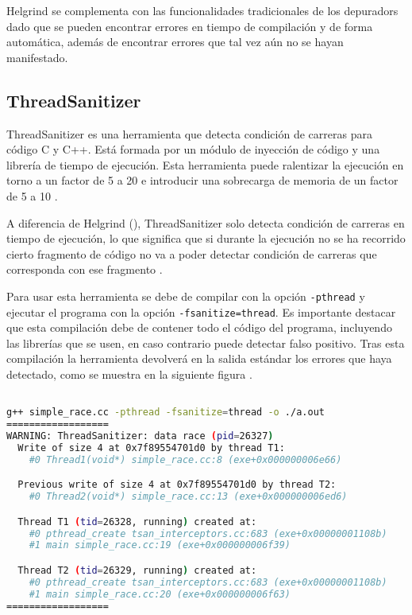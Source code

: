 Helgrind se complementa con las funcionalidades tradicionales de los \glspl{depurador} dado que se pueden encontrar errores en \gls{tiempo de compilación} y de forma automática, además de encontrar errores que tal vez aún no se hayan manifestado.

\subsection{ThreadSanitizer}{\label{subsec:thread-sanitizer}}

ThreadSanitizer es una herramienta que detecta \glspl{condición de carrera} para código C y C++. Está formada por un módulo de \gls{inyección de código} y una librería de \gls{tiempo de ejecución}. Esta herramienta puede ralentizar la ejecución en torno a un factor de 5 a 20 e introducir una sobrecarga de memoria de un factor de 5 a 10 \cite{ThreadSanitizer}.

A diferencia de Helgrind (), ThreadSanitizer solo detecta \glspl{condición de carrera} en \gls{tiempo de ejecución}, lo que significa que si durante la ejecución no se ha recorrido cierto fragmento de código no va a poder detectar \glspl{condición de carrera} que corresponda con ese fragmento \cite{ThreadSanitizerGithub}.

Para usar esta herramienta se debe de compilar con la opción \texttt{-pthread} y ejecutar el programa con la opción \texttt{-fsanitize=thread}. Es importante destacar que esta \gls{compilación} debe de contener todo el código del programa, incluyendo las librerías que se usen, en caso contrario puede detectar \gls{falso positivo}. Tras esta \gls{compilación} la herramienta devolverá en la \gls{salida estándar} los errores que haya detectado, como se muestra en la siguiente figura \cite{ThreadSanitizer}.

\begin{lstlisting}[language=bash, caption={Muestra de salida de ThreadSanitizer al detectar un error de condición de carrera \cite{ThreadSanitizerGithub}}]

g++ simple_race.cc -pthread -fsanitize=thread -o ./a.out 
==================
WARNING: ThreadSanitizer: data race (pid=26327)
  Write of size 4 at 0x7f89554701d0 by thread T1:
    #0 Thread1(void*) simple_race.cc:8 (exe+0x000000006e66)

  Previous write of size 4 at 0x7f89554701d0 by thread T2:
    #0 Thread2(void*) simple_race.cc:13 (exe+0x000000006ed6)

  Thread T1 (tid=26328, running) created at:
    #0 pthread_create tsan_interceptors.cc:683 (exe+0x00000001108b)
    #1 main simple_race.cc:19 (exe+0x000000006f39)

  Thread T2 (tid=26329, running) created at:
    #0 pthread_create tsan_interceptors.cc:683 (exe+0x00000001108b)
    #1 main simple_race.cc:20 (exe+0x000000006f63)
==================

\end{lstlisting}

